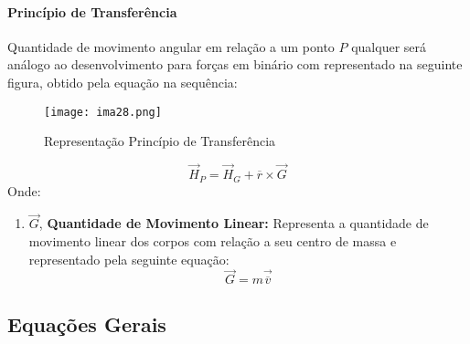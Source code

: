 \documentclass{article}
\begin{document}
            \paragraph{Princípio de Transferência}Quantidade de movimento angular em relação a um ponto $P$ qualquer será análogo ao desenvolvimento para forças em binário com representado na seguinte figura, obtido pela equação na sequência:
                \begin{figure}[H]
                    \centering
                    \texttt{[image: ima28.png]}
                    \caption{Representação Princípio de Transferência}
                \end{figure}
                \begin{equation}
                    \boxed{
                        \vec{H}_{P} = \vec{H}_{G} + \overline{r}\times\vec{G}
                    }
                \end{equation}
            Onde:
                \begin{enumerate}[rightmargin = \leftmargin, noitemsep]
                    \item $\vec{G}$, \textbf{Quantidade de Movimento Linear:} Representa a quantidade de movimento linear dos corpos com relação a seu centro de massa e representado pela seguinte equação:
                        \begin{equation}
                            \boxed{
                                \vec{G} = m\vec{\overline{v}}
                            }
                        \end{equation}
                \end{enumerate}
\newpage

        \subsection{Equações Gerais}
\end{document}
